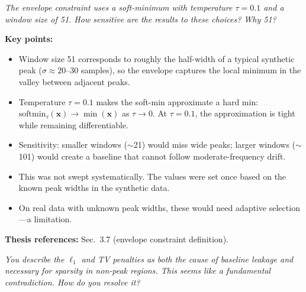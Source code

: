 \documentclass[11pt, letterpaper]{article}
\newcounter{qcounter}
\newcommand{\question}[1]{%
  \stepcounter{qcounter}%
  \begin{questionbox}[Q\theqcounter]%
    \itshape #1%
  \end{questionbox}%
}
\begin{document}
\question{The envelope constraint uses a soft-minimum with temperature
$\tau{=}0.1$ and a window size of 51.  How sensitive are the results
to these choices?  Why 51?}

\begin{answerbox}
\textbf{Key points:}
\begin{itemize}[nosep]
  \item Window size 51 corresponds to roughly the half-width of a
        typical synthetic peak ($\sigma \approx 20$--30 samples), so
        the envelope captures the local minimum in the valley between
        adjacent peaks.
  \item Temperature $\tau{=}0.1$ makes the soft-min approximate a
        hard min: $\text{softmin}_\tau(\mathbf{x}) \to \min(\mathbf{x})$
        as $\tau \to 0$.  At $\tau{=}0.1$, the approximation is tight
        while remaining differentiable.
  \item Sensitivity: smaller windows ($\sim$21) would miss wide peaks;
        larger windows ($\sim$101) would create a baseline that cannot
        follow moderate-frequency drift.
  \item This was not swept systematically.  The values were set once
        based on the known peak widths in the synthetic data.
  \item On real data with unknown peak widths, these would need
        adaptive selection---a limitation.
\end{itemize}
\textbf{Thesis references:} Sec.~3.7 (envelope constraint definition).
\end{answerbox}

\question{You describe the $\ell_1$ and TV penalties as \emph{both} the
cause of baseline leakage \emph{and} necessary for sparsity in
non-peak regions.  This seems like a fundamental contradiction.
How do you resolve it?}
\end{document}
